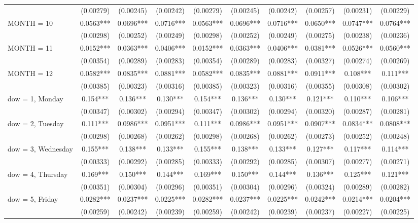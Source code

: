 \begin{tabular}{lccccccccc}
 & (0.00279) & (0.00245) & (0.00242) & (0.00279) & (0.00245) & (0.00242) & (0.00257) & (0.00231) & (0.00229) \\
MONTH = 10 & 0.0563*** & 0.0696*** & 0.0716*** & 0.0563*** & 0.0696*** & 0.0716*** & 0.0650*** & 0.0747*** & 0.0764*** \\
 & (0.00298) & (0.00252) & (0.00249) & (0.00298) & (0.00252) & (0.00249) & (0.00275) & (0.00238) & (0.00236) \\
MONTH = 11 & 0.0152*** & 0.0363*** & 0.0406*** & 0.0152*** & 0.0363*** & 0.0406*** & 0.0381*** & 0.0526*** & 0.0560*** \\
 & (0.00354) & (0.00289) & (0.00283) & (0.00354) & (0.00289) & (0.00283) & (0.00327) & (0.00274) & (0.00269) \\
MONTH = 12 & 0.0582*** & 0.0835*** & 0.0881*** & 0.0582*** & 0.0835*** & 0.0881*** & 0.0911*** & 0.108*** & 0.111*** \\
 & (0.00385) & (0.00323) & (0.00316) & (0.00385) & (0.00323) & (0.00316) & (0.00355) & (0.00308) & (0.00302) \\
dow = 1, Monday & 0.154*** & 0.136*** & 0.130*** & 0.154*** & 0.136*** & 0.130*** & 0.121*** & 0.110*** & 0.106*** \\
 & (0.00347) & (0.00302) & (0.00294) & (0.00347) & (0.00302) & (0.00294) & (0.00320) & (0.00287) & (0.00281) \\
dow = 2, Tuesday & 0.111*** & 0.0986*** & 0.0951*** & 0.111*** & 0.0986*** & 0.0951*** & 0.0907*** & 0.0834*** & 0.0808*** \\
 & (0.00298) & (0.00268) & (0.00262) & (0.00298) & (0.00268) & (0.00262) & (0.00273) & (0.00252) & (0.00248) \\
dow = 3, Wednesday & 0.155*** & 0.138*** & 0.133*** & 0.155*** & 0.138*** & 0.133*** & 0.127*** & 0.117*** & 0.114*** \\
 & (0.00333) & (0.00292) & (0.00285) & (0.00333) & (0.00292) & (0.00285) & (0.00307) & (0.00277) & (0.00271) \\
dow = 4, Thursday & 0.169*** & 0.150*** & 0.144*** & 0.169*** & 0.150*** & 0.144*** & 0.136*** & 0.125*** & 0.121*** \\
 & (0.00351) & (0.00304) & (0.00296) & (0.00351) & (0.00304) & (0.00296) & (0.00324) & (0.00289) & (0.00282) \\
dow = 5, Friday & 0.0282*** & 0.0237*** & 0.0225*** & 0.0282*** & 0.0237*** & 0.0225*** & 0.0242*** & 0.0214*** & 0.0204*** \\
 & (0.00259) & (0.00242) & (0.00239) & (0.00259) & (0.00242) & (0.00239) & (0.00237) & (0.00227) & (0.00225) \\

\end{tabular}

